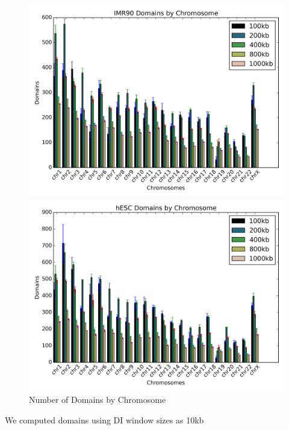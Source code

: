 \begin{figure}[H]
  \caption{Number of Domains by Chromosome}
  \begin{minipage}{0.45\textwidth}%
    \includegraphics[width=\textwidth]{./figures/results/domain_imr90_bar.png}
  \end{minipage}%
  \hfill
  \begin{minipage}{0.45\textwidth}
    \includegraphics[width=\textwidth]{./figures/results/domain_hesc_bar.png}
  \end{minipage}
\end{figure}

We computed domains using DI window sizes as 10kb

